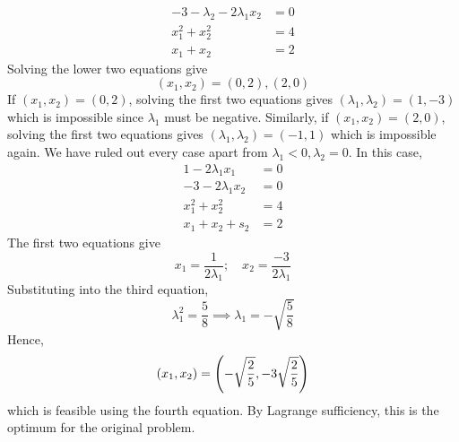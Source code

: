 \begin{example}
\begin{align*}
		-3-\lambda_2 - 2\lambda_1 x_2  & = 0 \\
		x_1^2 + x_2^2                  & = 4 \\
		x_1 + x_2                      & = 2
	\end{align*}
	Solving the lower two equations give
	\[
		(x_1, x_2) = (0, 2), (2, 0)
	\]
	If \((x_1, x_2) = (0, 2)\), solving the first two equations gives \((\lambda_1, \lambda_2) = (1, -3)\) which is impossible since \(\lambda_1\) must be negative.
	Similarly, if \((x_1, x_2) = (2, 0)\), solving the first two equations gives \((\lambda_1, \lambda_2) = (-1, 1)\) which is impossible again.
	We have ruled out every case apart from \(\lambda_1 < 0, \lambda_2 = 0\).
	In this case,
	\begin{align*}
		1 - 2\lambda_1 x_1  & = 0 \\
		-3 - 2\lambda_1 x_2 & = 0 \\
		x_1^2 + x_2^2       & = 4 \\
		x_1 + x_2 + s_2     & = 2
	\end{align*}
	The first two equations give
	\[
		x_1 = \frac{1}{2\lambda_1};\quad x_2 = \frac{-3}{2\lambda_1}
	\]
	Substituting into the third equation,
	\[
		\lambda_1^2 = \frac{5}{8} \implies \lambda_1 = -\sqrt{\frac{5}{8}}
	\]
	Hence,
	\[
		(x_1, x_2) = \qty(-\sqrt{\frac{2}{5}}, -3\sqrt{\frac{2}{5}})
	\]
	which is feasible using the fourth equation.
	By Lagrange sufficiency, this is the optimum for the original problem.
\end{example}

